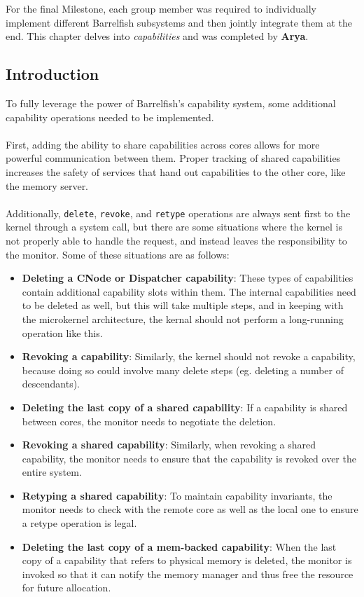 For the final Milestone, each group member was required to individually implement different Barrelfish subsystems and then jointly integrate them at the end. This chapter delves into \textit{capabilities} and was completed by \textbf{Arya}.

\subsection{Introduction}
To fully leverage the power of Barrelfish's capability system, some additional capability operations needed to be implemented. 
\\\\
First, adding the ability to share capabilities across cores allows for more powerful communication between them. Proper tracking of shared capabilities increases the safety of services that hand out capabilities to the other core, like the memory server.
\\\\
Additionally, \texttt{delete}, \texttt{revoke}, and \texttt{retype} operations are always sent first to the kernel through a system call, but there are some situations where the kernel is not properly able to handle the request, and instead leaves the responsibility to the monitor. Some of these situations are as follows:
\\
\begin{itemize}
    \item \textbf{Deleting a CNode or Dispatcher capability}: These types of capabilities contain additional capability slots within them. The internal capabilities need to be deleted as well, but this will take multiple steps, and in keeping with the microkernel architecture, the kernal should not perform a long-running operation like this. 
    \item \textbf{Revoking a capability}: Similarly, the kernel should not revoke a capability, because doing so could involve many delete steps (eg. deleting a number of descendants).
    \item \textbf{Deleting the last copy of a shared capability}: If a capability is shared between cores, the monitor needs to negotiate the deletion.
    \item \textbf{Revoking a shared capability}: Similarly, when revoking a shared capability, the monitor needs to ensure that the capability is revoked over the entire system.
    \item \textbf{Retyping a shared capability}: To maintain capability invariants, the monitor needs to check with the remote core as well as the local one to ensure a retype operation is legal.
    \item \textbf{Deleting the last copy of a mem-backed capability}: When the last copy of a capability that refers to physical memory is deleted, the monitor is invoked so that it can notify the memory manager and thus free the resource for future allocation.
\end{itemize}
